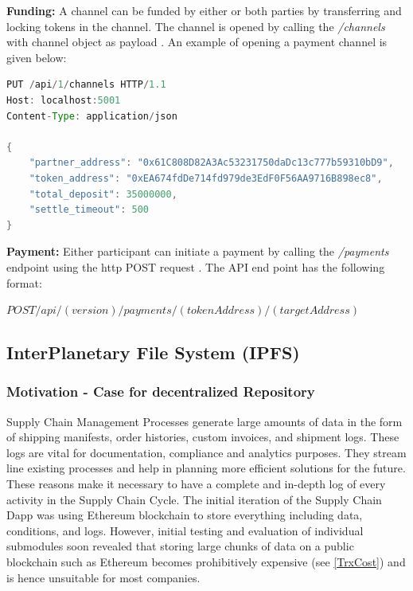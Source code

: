 \textbf{Funding:} A channel can be funded by either or both parties by transferring and locking tokens in the channel. The channel is opened by calling the \textit{/channels} with channel object as payload \cite{rad:001}. An example of opening a payment channel is given below: 
\begin{lstlisting}[language=Java,frame=single,tabsize=2,showspaces=false,showstringspaces=false,
  keywordstyle=\color{blue},morekeywords={function,returns,constant,memory},caption={Opening a Payement Channel on Raiden \cite{rad:001}}]
PUT /api/1/channels HTTP/1.1
Host: localhost:5001
Content-Type: application/json

{
    "partner_address": "0x61C808D82A3Ac53231750daDc13c777b59310bD9",
    "token_address": "0xEA674fdDe714fd979de3EdF0F56AA9716B898ec8",
    "total_deposit": 35000000,
    "settle_timeout": 500
}
\end{lstlisting}
\textbf{Payment:} Either participant can initiate a payment by calling the \textit{/payments} endpoint using the http POST request \cite{rad:001}. The API end point has the following format:

\textbf{$POST /api/(version)/payments/(tokenAddress)/(targetAddress)$} \cite{rad:001}

\vspace{0.5cm}
\subsection{InterPlanetary File System (IPFS)} \label{IPFS}
\subsubsection{Motivation - Case for decentralized Repository} \label{motivation}
Supply Chain Management Processes generate large amounts of data in the form of shipping manifests, order histories, custom invoices, and shipment logs. These logs are vital for documentation, compliance and analytics purposes. They stream line existing processes and help in planning more efficient solutions for the future. These reasons make it necessary to have a complete and in-depth log of every activity in the Supply Chain Cycle. The initial iteration of the Supply Chain Dapp was using Ethereum blockchain to store everything including data, conditions, and logs. However, initial testing and evaluation of individual submodules soon revealed that storing large chunks of data on a public blockchain such as Ethereum becomes prohibitively expensive (see \ref{TrxCost}) and is hence unsuitable for most companies.
\vspace{0.5cm}

